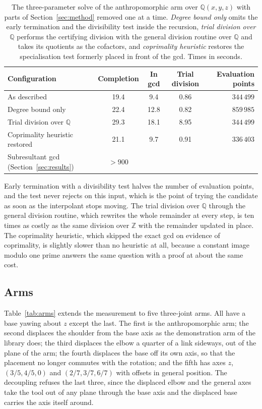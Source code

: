 \documentclass[11pt,a4paper]{article}
\theoremstyle{plain}
\theoremstyle{definition}
\theoremstyle{remark}
\newcommand{\QQ}{\mathbb{Q}}
\begin{document}
\begin{table}[htbp]
\centering
\caption{The three-parameter solve of the anthropomorphic arm over $\QQ(x,y,z)$ with parts of
Section~\ref{sec:method} removed one at a time. \emph{Degree bound only} omits the early termination and the
divisibility test inside the recursion, \emph{trial division over $\QQ$} performs the certifying
division with the general division routine over $\QQ$ and takes its quotients as the cofactors, and
\emph{coprimality heuristic} restores the specialisation test formerly placed in front of the gcd. Times in
seconds.}
\label{tab:ablation}
\small
\begin{tabular}{lS[table-format=3.1]S[table-format=2.1]S[table-format=1.2]r}
\toprule
Configuration & {Completion} & {In gcd} & {Trial division} & Evaluation points \\
\midrule
As described & 19.4 & 9.4 & 0.86 & $344\,499$ \\
Degree bound only & 22.4 & 12.8 & 0.82 & $859\,985$ \\
Trial division over $\QQ$ & 29.3 & 18.1 & 8.95 & $344\,499$ \\
Coprimality heuristic restored & 21.1 & 9.7 & 0.91 & $336\,403$ \\
Subresultant gcd (Section~\ref{sec:results}) & {$>900$} & & & \\
\bottomrule
\end{tabular}
\end{table}

Early termination with a divisibility test halves the number of evaluation points, and the test
never rejects on this input, which is the point of trying the candidate as soon as the interpolant
stops moving. The trial division over $\QQ$ through the general division routine, which rewrites the
whole remainder at every step, is ten times as costly as the same division over $\mathbb{Z}$ with the
remainder updated in place. The coprimality heuristic, which skipped the exact gcd on evidence of
coprimality, is slightly slower than no heuristic at all, because a constant image modulo one prime answers
the same question with a proof at about the same cost.

\subsection{Arms}

Table~\ref{tab:arms} extends the measurement to five three-joint arms. All have a base yawing about
$z$ except the last. The first is the anthropomorphic arm; the second displaces the shoulder from the
base axis as the demonstration arm of the library does; the third displaces the elbow a quarter of a
link sideways, out of the plane of the arm; the fourth displaces the base off its own axis, so that
the placement no longer commutes with the rotation; and the fifth has axes $z$, $(3/5, 4/5, 0)$ and
$(2/7, 3/7, 6/7)$ with offsets in general position. The decoupling refuses the last three, since the
displaced elbow and the general axes take the tool out of any plane through the base axis and the
displaced base carries the axis itself around.
\end{document}
